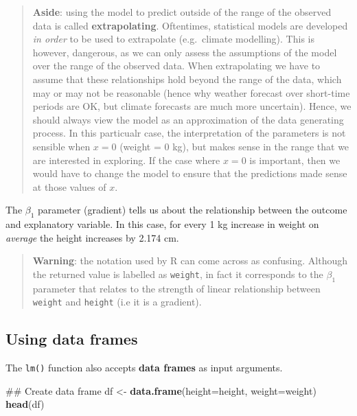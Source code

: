\documentclass[]{book}
\newenvironment{Shaded}{\begin{snugshade}}{\end{snugshade}}
\newcommand{\KeywordTok}[1]{\textcolor[rgb]{0.13,0.29,0.53}{\textbf{#1}}}
\newcommand{\DataTypeTok}[1]{\textcolor[rgb]{0.13,0.29,0.53}{#1}}
\newcommand{\StringTok}[1]{\textcolor[rgb]{0.31,0.60,0.02}{#1}}
\newcommand{\NormalTok}[1]{#1}
\theoremstyle{definition}
\theoremstyle{definition}
\theoremstyle{definition}
\theoremstyle{remark}
\begin{document}
\begin{quote}
\textbf{Aside}: using the model to predict outside of the range of the
observed data is called \textbf{extrapolating}. Oftentimes, statistical
models are developed \emph{in order} to be used to extrapolate
(e.g.~climate modelling). This is however, dangerous, as we can only
assess the assumptions of the model over the range of the observed data.
When extrapolating we have to assume that these relationships hold
beyond the range of the data, which may or may not be reasonable (hence
why weather forecast over short-time periods are OK, but climate
forecasts are much more uncertain). Hence, we should always view the
model as an approximation of the data generating process. In this
particualr case, the interpretation of the parameters is not sensible
when \(x = 0\) (weight = 0 kg), but makes sense in the range that we are
interested in exploring. If the case where \(x = 0\) is important, then
we would have to change the model to ensure that the predictions made
sense at those values of \(x\).
\end{quote}

The \(\beta_1\) parameter (gradient) tells us about the relationship
between the outcome and explanatory variable. In this case, for every 1
kg increase in weight on \emph{average} the height increases by 2.174
cm.

\begin{quote}
\textbf{Warning}: the notation used by R can come across as confusing.
Although the returned value is labelled as \texttt{weight}, in fact it
corresponds to the \(\beta_1\) parameter that relates to the strength of
linear relationship between \texttt{weight} and \texttt{height} (i.e it
is a gradient).
\end{quote}

\subsection{Using data frames}\label{using-data-frames}

The \texttt{lm()} function also accepts \textbf{data frames} as input
arguments.

\begin{Shaded}
\begin{Highlighting}[]
\NormalTok{## Create data frame}
\NormalTok{df <-}\StringTok{ }\KeywordTok{data.frame}\NormalTok{(}\DataTypeTok{height=}\NormalTok{height, }\DataTypeTok{weight=}\NormalTok{weight)}
\KeywordTok{head}\NormalTok{(df)}
\end{Highlighting}
\end{Shaded}
\end{document}

